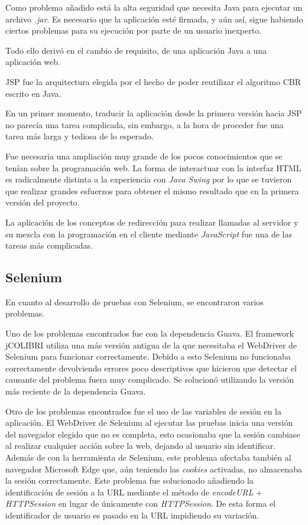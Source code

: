 Como problema añadido está la alta seguridad que necesita Java para ejecutar un archivo \emph{.jar}. Es necesario que la aplicación esté firmada, y aún así, sigue habiendo ciertos problemas para su ejecución por parte de un usuario inexperto.

Todo ello derivó en el cambio de requisito, de una aplicación Java a una aplicación web.

JSP fue la arquitectura elegida por el hecho de poder reutilizar el algoritmo CBR escrito en Java.

En un primer momento, traducir la aplicación desde la primera versión hacia JSP no parecía una tarea complicada, sin embargo, a la hora de proceder fue una tarea más larga y tediosa de lo esperado.

Fue necesaria una ampliación muy grande de los pocos conocimientos que se tenían sobre la programación web. La forma de interactuar con la interfaz HTML es radicalmente distinta a la experiencia con \emph{Java Swing} por lo que se tuvieron que realizar grandes esfuerzos para obtener el mismo resultado que en la primera versión del proyecto.

La aplicación de los conceptos de redirección para realizar llamadas al servidor y su mezcla con la programación en el cliente mediante \emph{JavaScript} fue una de las tareas más complicadas.

\subsection{Selenium}

En cuanto al desarrollo de pruebas con Selenium, se encontraron varios problemas.

Uno de los problemas encontrados fue con la dependencia Guava. El framework jCOLIBRI utiliza una más versión antigua de la que necesitaba el WebDriver de Selenium para funcionar correctamente. Debido a esto Selenium no funcionaba correctamente devolviendo errores poco descriptivos que hicieron que detectar el causante del problema fuera muy complicado. Se solucionó utilizando la versión más reciente de la dependencia Guava.

Otro de los problemas encontrados fue el uso de las variables de sesión en la aplicación. El WebDriver de Selenium al ejecutar las pruebas inicia una versión del navegador elegido que no es completa, esto ocasionaba que la sesión cambiase al realizar cualquier acción sobre la web, dejando al usuario sin identificar. Además de con la herramienta de Selenium, este problema afectaba también al navegador Microsoft Edge que, aún teniendo las \emph{cookies} activadas, no almacenaba la sesión correctamente. Este problema fue solucionado añadiendo la identificación de sesión a la URL mediante el método de \emph{encodeURL} + \emph{HTTPSession} en lugar de únicamente con \emph{HTTPSession}. De esta forma el identificador de usuario es pasado en la URL impidiendo su variación.


